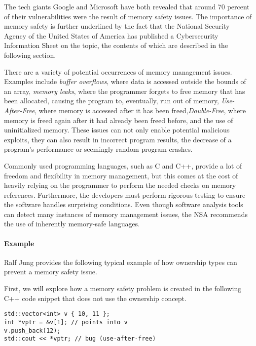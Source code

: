 \documentclass[sigplan,11pt,nonacm]{acmart}
\begin{document}
The tech giants Google \cite{google-memory-safety} and Microsoft \cite{microsoft-memory-safety} have both revealed that around 70 percent of their vulnerabilities were the result of memory safety issues.
The importance of memory safety is further underlined by the fact that the National Security Agency of the United States of America has published a Cybersecurity Information Sheet \cite{nsa-memory-safety} on the topic, the contents of which are described in the following section.

There are a variety of potential occurrences of memory management issues.
Examples include \emph{buffer overflows}, where data is accessed outside the bounds of an array, \emph{memory leaks}, where the programmer forgets to free memory that has been allocated, causing the program to, eventually, run out of memory, \emph{Use-After-Free}, where memory is accessed after it has been freed,\emph{Double-Free}, where memory is freed again after it had already been freed before, and the use of uninitialized memory.
These issues can not only enable potential malicious exploits, they can also result in incorrect program results, the decrease of a program's performance or seemingly random program crashes.

Commonly used programming languages, such as C and C++, provide a lot of freedom and flexibility in memory management, but this comes at the cost of heavily relying on the programmer to perform the needed checks on memory references.
Furthermore, the developers must perform rigorous testing to ensure the software handles surprising conditions.
Even though software analysis tools can detect many instances of memory management issues, the NSA recommends the use of inherently memory-safe languages.


\paragraph{Example}

Ralf Jung \cite{understanding-evolving-rust} provides the following typical example of how ownership types can prevent a memory safety issue.

First, we will explore how a memory safety problem is created in the following C++ code snippet that does not use the ownership concept.

\begin{lstlisting}
std::vector<int> v { 10, 11 };
int *vptr = &v[1]; // points into v
v.push_back(12);
std::cout << *vptr; // bug (use-after-free)
\end{lstlisting}
\end{document}

